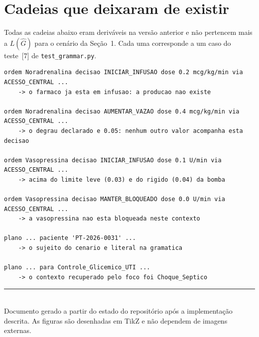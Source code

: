 \documentclass[11pt,a4paper]{article}
\begin{document}
\appendix
\section{Cadeias que deixaram de existir}

Todas as cadeias abaixo eram deriváveis na versão anterior e não pertencem mais
a $L(\hat{G})$ para o cenário da Seção~1. Cada uma corresponde a um caso do
teste~[7] de \texttt{test\_grammar.py}.

\begin{lstlisting}[language=bnf,caption={Cadeias agora inexprimíveis.}]
ordem Noradrenalina decisao INICIAR_INFUSAO dose 0.2 mcg/kg/min via ACESSO_CENTRAL ...
    -> o farmaco ja esta em infusao: a producao nao existe

ordem Noradrenalina decisao AUMENTAR_VAZAO dose 0.4 mcg/kg/min via ACESSO_CENTRAL ...
    -> o degrau declarado e 0.05: nenhum outro valor acompanha esta decisao

ordem Vasopressina decisao INICIAR_INFUSAO dose 0.1 U/min via ACESSO_CENTRAL ...
    -> acima do limite leve (0.03) e do rigido (0.04) da bomba

ordem Vasopressina decisao MANTER_BLOQUEADO dose 0.0 U/min via ACESSO_CENTRAL ...
    -> a vasopressina nao esta bloqueada neste contexto

plano ... paciente 'PT-2026-0031' ...
    -> o sujeito do cenario e literal na gramatica

plano ... para Controle_Glicemico_UTI ...
    -> o contexto recuperado pelo foco foi Choque_Septico
\end{lstlisting}

\vspace{4mm}
\noindent\rule{\linewidth}{0.4pt}\\[1mm]
{\footnotesize Documento gerado a partir do estado do repositório após a
implementação descrita. As figuras são desenhadas em TikZ e não dependem de
imagens externas.}
\end{document}
